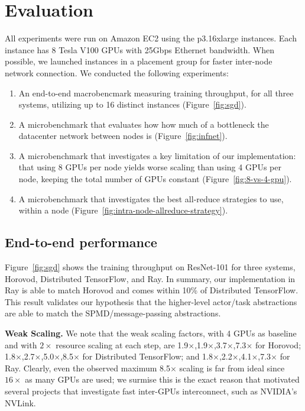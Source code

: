 \section{Evaluation}
All experiments were run on Amazon EC2 using the p3.16xlarge instances.  Each instance has 8 Tesla V100 GPUs with 25Gbps Ethernet bandwidth.  When possible, we launched instances in a placement group for faster inter-node network connection.  We conducted the following experiments:

\begin{enumerate}
    \item An end-to-end macrobencmark measuring training throughput, for all three systems, utilizing up to 16 distinct instances (Figure~\ref{fig:sgd}).
    \item A microbenchmark that evaluates how how much of a bottleneck the datacenter network between nodes is (Figure~\ref{fig:infnet}).
    \item A microbenchmark that investigates a key limitation of our implementation: that using 8 GPUs per node yields worse scaling than using 4 GPUs per node, keeping the total number of GPUs constant (Figure~\ref{fig:8-vs-4-gpu}).
    \item A microbenchmark that investigates the best all-reduce strategies to use, within a node (Figure~\ref{fig:intra-node-allreduce-strategy}).
\end{enumerate}


\subsection{End-to-end performance}
Figure~\ref{fig:sgd} shows the training throughput on ResNet-101 for three systems, Horovod, Distributed TensorFlow, and Ray.  In summary, our implementation in Ray is able to match Horovod and comes within 10\% of Distributed TensorFlow.  This result validates our hypothesis that the higher-level actor/task abstractions are able to match the SPMD/message-passing abstractions.

{\bf Weak Scaling.}  We note that the weak scaling factors, with 4 GPUs as baseline and with $2\times$ resource scaling at each step, are 1.9$\times$,1.9$\times$,3.7$\times$,7.3$\times$ for Horovod;
1.8$\times$,2.7$\times$,5.0$\times$,8.5$\times$ for Distributed TensorFlow;
and
1.8$\times$,2.2$\times$,4.1$\times$,7.3$\times$ for Ray.  Clearly, even the observed maximum 8.5$\times$ scaling  is far from ideal since $16\times$ as many GPUs are used; we surmise this is the exact reason that motivated several projects that investigate fast inter-GPUs interconnect, such as  NVIDIA's NVLink.

